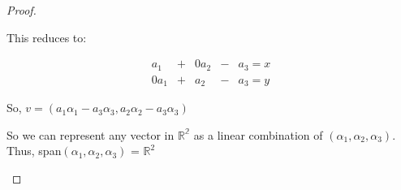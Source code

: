 \documentclass[12pt,letterpaper]{article}
\begin{document}
\begin{proof}
\begin{enumerate}
        This reduces to:

        \begin{align*}
          a_1 & + & 0a_2 & - & a_3 = x \\
          0a_1 & + & a_2 & - & a_3 = y
        \end{align*}

        So, $v = (a_1\alpha_1 - a_3\alpha_3, a_2\alpha_2 - a_3\alpha_3)$

        So we can represent any vector in $\mathbb{R^2}$ as a linear combination
        of $(\alpha_1, \alpha_2, \alpha_3)$.
        Thus, span$(\alpha_1, \alpha_2, \alpha_3)$ = $\mathbb{R}^2$

    \end{enumerate}
  \end{proof}
\end{document}
